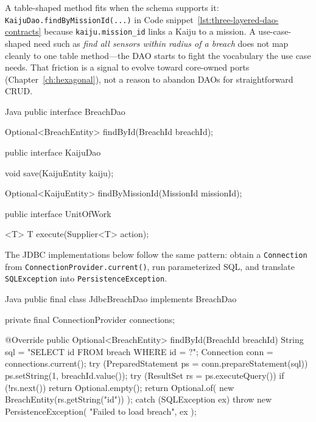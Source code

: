 A table-shaped method fits when the schema supports it: \texttt{KaijuDao.findByMissionId(...)} in Code snippet~\ref{lst:three-layered-dao-contracts} because \texttt{kaiju.mission\_id} links a Kaiju to a mission. A use-case-shaped need such as \textit{find all sensors within radius of a breach} does not map cleanly to one table method---the DAO starts to fight the vocabulary the use case needs. That friction is a signal to evolve toward core-owned ports (Chapter~\ref{ch:hexagonal}), not a reason to abandon DAOs for straightforward CRUD.

\begin{ridercode}{Java}
public interface BreachDao
{

    Optional<BreachEntity> findById(BreachId breachId);

}

public interface KaijuDao
{

    void save(KaijuEntity kaiju);

    Optional<KaijuEntity> findByMissionId(MissionId missionId);

}

public interface UnitOfWork
{

    <T> T execute(Supplier<T> action);

}
\end{ridercode}
\label{lst:three-layered-dao-contracts}

The JDBC implementations below follow the same pattern: obtain a \texttt{Connection} from \texttt{ConnectionProvider.current()}, run parameterized SQL, and translate \texttt{SQLException} into \texttt{PersistenceException}.

\begin{ridercode}{Java}
public final class JdbcBreachDao implements BreachDao
{
    private final ConnectionProvider connections;

    @Override
    public Optional<BreachEntity> findById(BreachId breachId)
    {
        String sql = "SELECT id FROM breach WHERE id = ?";
        Connection conn = connections.current();
        try (PreparedStatement ps = conn.prepareStatement(sql))
        {
            ps.setString(1, breachId.value());
            try (ResultSet rs = ps.executeQuery())
            {
                if (!rs.next())
                {
                    return Optional.empty();
                }
                return Optional.of(
                    new BreachEntity(rs.getString("id"))
                );
            }
        }
        catch (SQLException ex)
        {
            throw new PersistenceException(
                "Failed to load breach",
                ex
            );
        }
    }
}
\end{ridercode}
\label{lst:three-layered-jdbc-breach-dao}


